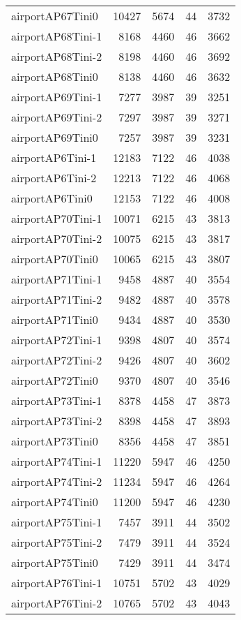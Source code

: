 \documentclass[../../../thesis.tex]{subfiles}
\begin{document}
\begin{longtable}{lrrrr}
airportAP67Tini0 & 10427 & 5674 & 44 & 3732 \\
airportAP68Tini-1 & 8168 & 4460 & 46 & 3662 \\
airportAP68Tini-2 & 8198 & 4460 & 46 & 3692 \\
airportAP68Tini0 & 8138 & 4460 & 46 & 3632 \\
airportAP69Tini-1 & 7277 & 3987 & 39 & 3251 \\
airportAP69Tini-2 & 7297 & 3987 & 39 & 3271 \\
airportAP69Tini0 & 7257 & 3987 & 39 & 3231 \\
airportAP6Tini-1 & 12183 & 7122 & 46 & 4038 \\
airportAP6Tini-2 & 12213 & 7122 & 46 & 4068 \\
airportAP6Tini0 & 12153 & 7122 & 46 & 4008 \\
airportAP70Tini-1 & 10071 & 6215 & 43 & 3813 \\
airportAP70Tini-2 & 10075 & 6215 & 43 & 3817 \\
airportAP70Tini0 & 10065 & 6215 & 43 & 3807 \\
airportAP71Tini-1 & 9458 & 4887 & 40 & 3554 \\
airportAP71Tini-2 & 9482 & 4887 & 40 & 3578 \\
airportAP71Tini0 & 9434 & 4887 & 40 & 3530 \\
airportAP72Tini-1 & 9398 & 4807 & 40 & 3574 \\
airportAP72Tini-2 & 9426 & 4807 & 40 & 3602 \\
airportAP72Tini0 & 9370 & 4807 & 40 & 3546 \\
airportAP73Tini-1 & 8378 & 4458 & 47 & 3873 \\
airportAP73Tini-2 & 8398 & 4458 & 47 & 3893 \\
airportAP73Tini0 & 8356 & 4458 & 47 & 3851 \\
airportAP74Tini-1 & 11220 & 5947 & 46 & 4250 \\
airportAP74Tini-2 & 11234 & 5947 & 46 & 4264 \\
airportAP74Tini0 & 11200 & 5947 & 46 & 4230 \\
airportAP75Tini-1 & 7457 & 3911 & 44 & 3502 \\
airportAP75Tini-2 & 7479 & 3911 & 44 & 3524 \\
airportAP75Tini0 & 7429 & 3911 & 44 & 3474 \\
airportAP76Tini-1 & 10751 & 5702 & 43 & 4029 \\
airportAP76Tini-2 & 10765 & 5702 & 43 & 4043 \\

\end{longtable}
\end{document}
